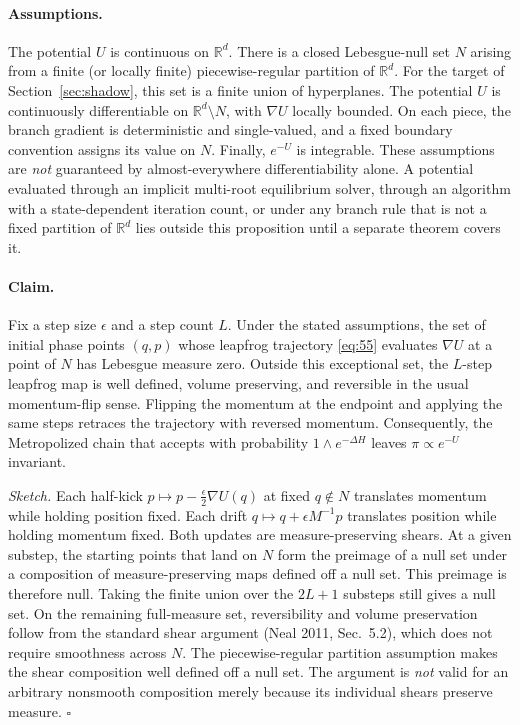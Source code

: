 \documentclass[11pt]{article}
\begin{document}
\paragraph{Assumptions.}
The potential $U$ is continuous on $\mathbb R^d$. There is a closed Lebesgue-null set $N$ arising from a finite (or locally finite) piecewise-regular partition of $\mathbb R^d$. For the target of Section~\ref{sec:shadow}, this set is a finite union of hyperplanes. The potential $U$ is continuously differentiable on $\mathbb R^d\setminus N$, with $\nabla U$ locally bounded. On each piece, the branch gradient is deterministic and single-valued, and a fixed boundary convention assigns its value on $N$. Finally, $e^{-U}$ is integrable. These assumptions are \emph{not} guaranteed by almost-everywhere differentiability alone. A potential evaluated through an implicit multi-root equilibrium solver, through an algorithm with a state-dependent iteration count, or under any branch rule that is not a fixed partition of $\mathbb R^d$ lies outside this proposition until a separate theorem covers it.

\paragraph{Claim.}
Fix a step size $\epsilon$ and a step count $L$. Under the stated assumptions, the set of initial phase points $(q,p)$ whose leapfrog trajectory \eqref{eq:55} evaluates $\nabla U$ at a point of $N$ has Lebesgue measure zero. Outside this exceptional set, the $L$-step leapfrog map is well defined, volume preserving, and reversible in the usual momentum-flip sense. Flipping the momentum at the endpoint and applying the same steps retraces the trajectory with reversed momentum. Consequently, the Metropolized chain that accepts with probability $1\wedge e^{-\Delta H}$ leaves $\pi\propto e^{-U}$ invariant.

\emph{Sketch.} Each half-kick $p\mapsto p-\tfrac\epsilon2\nabla U(q)$ at fixed $q\notin N$ translates momentum while holding position fixed. Each drift $q\mapsto q+\epsilon M^{-1}p$ translates position while holding momentum fixed. Both updates are measure-preserving shears. At a given substep, the starting points that land on $N$ form the preimage of a null set under a composition of measure-preserving maps defined off a null set. This preimage is therefore null. Taking the finite union over the $2L+1$ substeps still gives a null set. On the remaining full-measure set, reversibility and volume preservation follow from the standard shear argument (Neal 2011, Sec.~5.2), which does not require smoothness across $N$. The piecewise-regular partition assumption makes the shear composition well defined off a null set. The argument is \emph{not} valid for an arbitrary nonsmooth composition merely because its individual shears preserve measure. $\square$
\end{document}
